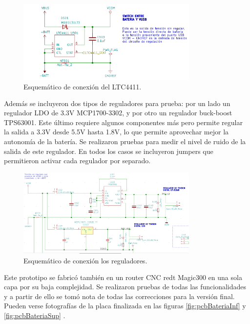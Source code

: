 \begin{figure}[!htbp]
	\centering
	
	\includegraphics[width=0.8\textwidth]{./Figures/switchBateria.png}		
	
	\caption{Esquemático de conexión del LTC4411.}
	\label{fig:switchBateria}
\end{figure}

Además se incluyeron dos tipos de reguladores para prueba: por un lado un regulador LDO de 3.3V MCP1700-3302, y por otro un regulador buck-boost TPS63001. Este último requiere algunos componentes más pero permite regular la salida a 3.3V desde 5.5V hasta 1.8V, lo que permite aprovechar mejor la autonomía de la batería. Se realizaron pruebas para medir el nivel de ruido de la salida de este regulador. En todos los casos se incluyeron jumpers que permitieron activar cada regulador por separado.

\begin{figure}[!htbp]
	\centering
	\includegraphics[width=0.8\textwidth]{./Figures/reguladores.png}			
	\caption{Esquemático de conexión los reguladores.}
	\label{fig:reguladores}
\end{figure}

Este prototipo se fabricó también en un router CNC redt Magic300 en una sola capa por su baja complejidad. Se realizaron pruebas de todas las funcionalidades y a partir de ello se tomó nota de todas las correcciones para la versión final. Pueden verse fotografías de la placa finalizada en las figuras \ref{fig:pcbBateriaInf} y \ref{fig:pcbBateriaSup} .

